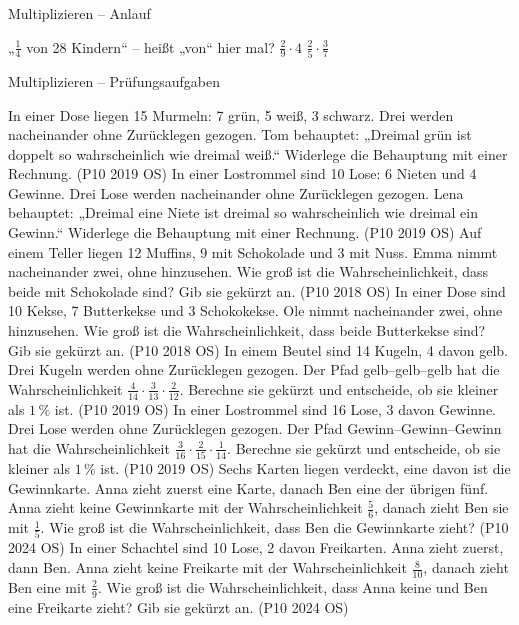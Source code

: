 \begin{aufgabe}{Multiplizieren – Anlauf}
\begin{teile}
\teil „$\frac{1}{4}$ von 28 Kindern“ – heißt „von“ hier mal? \janein
\teil $\frac{2}{9} \cdot 4$
\teil $\frac{2}{5} \cdot \frac{3}{7}$
\end{teile}
\end{aufgabe}

\begin{aufgabe}{Multiplizieren – Prüfungsaufgaben}
\begin{teile}
\steil In einer Dose liegen 15 Murmeln: 7 grün, 5 weiß, 3 schwarz. Drei werden nacheinander ohne Zurücklegen gezogen. Tom behauptet: „Dreimal grün ist doppelt so wahrscheinlich wie dreimal weiß.“ Widerlege die Behauptung mit einer Rechnung. \hfill (P10 2019 OS)
\steil In einer Lostrommel sind 10 Lose: 6 Nieten und 4 Gewinne. Drei Lose werden nacheinander ohne Zurücklegen gezogen. Lena behauptet: „Dreimal eine Niete ist dreimal so wahrscheinlich wie dreimal ein Gewinn.“ Widerlege die Behauptung mit einer Rechnung. \hfill (P10 2019 OS)
\steil Auf einem Teller liegen 12 Muffins, 9 mit Schokolade und 3 mit Nuss. Emma nimmt nacheinander zwei, ohne hinzusehen. Wie groß ist die Wahrscheinlichkeit, dass beide mit Schokolade sind? Gib sie gekürzt an. \hfill (P10 2018 OS)
\steil In einer Dose sind 10 Kekse, 7 Butterkekse und 3 Schokokekse. Ole nimmt nacheinander zwei, ohne hinzusehen. Wie groß ist die Wahrscheinlichkeit, dass beide Butterkekse sind? Gib sie gekürzt an. \hfill (P10 2018 OS)
\steil In einem Beutel sind 14 Kugeln, 4 davon gelb. Drei Kugeln werden ohne Zurücklegen gezogen. Der Pfad gelb–gelb–gelb hat die Wahrscheinlichkeit $\frac{4}{14} \cdot \frac{3}{13} \cdot \frac{2}{12}$. Berechne sie gekürzt und entscheide, ob sie kleiner als $1\,\%$ ist. \hfill (P10 2019 OS)
\steil In einer Lostrommel sind 16 Lose, 3 davon Gewinne. Drei Lose werden ohne Zurücklegen gezogen. Der Pfad Gewinn–Gewinn–Gewinn hat die Wahrscheinlichkeit $\frac{3}{16} \cdot \frac{2}{15} \cdot \frac{1}{14}$. Berechne sie gekürzt und entscheide, ob sie kleiner als $1\,\%$ ist. \hfill (P10 2019 OS)
\steil Sechs Karten liegen verdeckt, eine davon ist die Gewinnkarte. Anna zieht zuerst eine Karte, danach Ben eine der übrigen fünf. Anna zieht keine Gewinnkarte mit der Wahrscheinlichkeit $\frac{5}{6}$, danach zieht Ben sie mit $\frac{1}{5}$. Wie groß ist die Wahrscheinlichkeit, dass Ben die Gewinnkarte zieht? \hfill (P10 2024 OS)
\steil In einer Schachtel sind 10 Lose, 2 davon Freikarten. Anna zieht zuerst, dann Ben. Anna zieht keine Freikarte mit der Wahrscheinlichkeit $\frac{8}{10}$, danach zieht Ben eine mit $\frac{2}{9}$. Wie groß ist die Wahrscheinlichkeit, dass Anna keine und Ben eine Freikarte zieht? Gib sie gekürzt an. \hfill (P10 2024 OS)
\end{teile}
\end{aufgabe}

